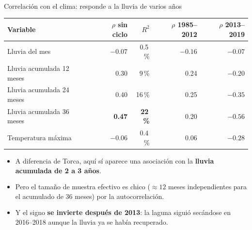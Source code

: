 \documentclass[10pt]{beamer}
\newcommand{\dato}[1]{\textbf{\color{blue!60!black}#1}}
\begin{document}
\begin{frame}{Correlación con el clima: responde a la lluvia de varios años}
\centering
\footnotesize
\begin{tabular}{lrrrr}
\toprule
Variable & $\rho$ sin ciclo & $R^2$ & $\rho$ 1985--2012 & $\rho$ 2013--2019 \\
\midrule
Lluvia del mes & $-0.07$ & 0.5\,\% & $-0.16$ & $-0.07$ \\
Lluvia acumulada 12 meses & 0.30 & 9\,\% & 0.24 & $-0.20$ \\
Lluvia acumulada 24 meses & 0.40 & 16\,\% & 0.25 & $-0.35$ \\
Lluvia acumulada 36 meses & \dato{0.47} & \dato{22\,\%} & 0.20 & $-0.56$ \\
Temperatura máxima & $-0.06$ & 0.4\,\% & 0.06 & $-0.28$ \\
\bottomrule
\end{tabular}
\vspace{3mm}
\begin{itemize}
\item A diferencia de Torca, aquí sí aparece una asociación con la \textbf{lluvia acumulada de 2 a 3 años}.
\item Pero el tamaño de muestra efectivo es chico (${\approx}12$ meses independientes para el acumulado de 36 meses) por la autocorrelación.
\item Y el signo \textbf{se invierte después de 2013}: la laguna siguió secándose en 2016--2018 aunque la lluvia ya se había recuperado.
\end{itemize}
\end{frame}
\end{document}
